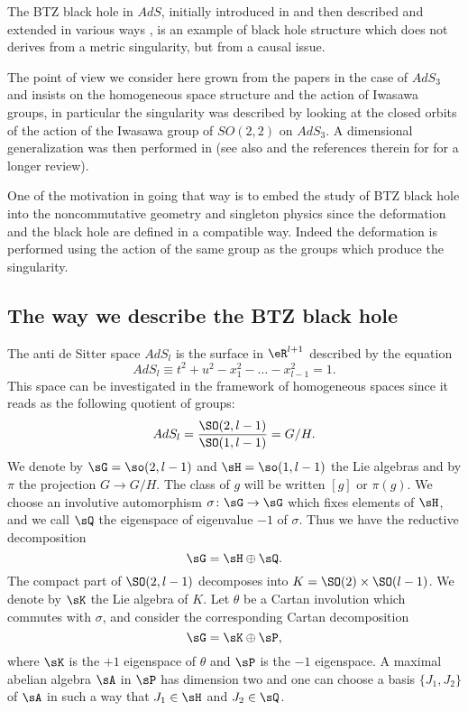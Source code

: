 The BTZ black hole in $AdS$, initially introduced in \cite{BTZ_un,BTZ_deux} and then described and extended in various ways \cite{HolstPeldan,Aminneborg,Madden}, is an example of black hole structure which does not derives from a metric singularity, but from a causal issue.

The point of view we consider here grown from the papers \cite{BTZB_deux,Keio} in the case of $AdS_3$ and insists on the homogeneous space structure and the action of Iwasawa groups, in particular the singularity was described by looking at the closed orbits of the action of the Iwasawa group of $SO(2,2)$ on $AdS_3$. A dimensional generalization was then performed in \cite{lcTNAdS} (see also \cite{These} and the references therein for for a longer review).

One of the motivation in going that way is to embed the study of BTZ black hole into the noncommutative geometry and singleton physics \cite{BTZ_WZW,articleBVCS} since the deformation and the black hole are defined in a compatible way. Indeed the deformation is performed using the action of the same group as the groups which produce the singularity.

%
\subsection{The way we describe the BTZ black hole}
%

The anti de Sitter space $AdS_l$ is the surface in $\eR^{l+1}$ described by the equation
\begin{equation}
	AdS_l\equiv t^2+u^2-x_1^2-\ldots-x_{l-1}^2=1.
\end{equation}
This space can be investigated in the framework of homogeneous spaces since it reads as the following quotient of groups:
\begin{equation}
	AdS_l=\frac{ \SO(2,l-1) }{ \SO(1,l-1) }=G/H.
\end{equation}
We denote by $\sG=\so(2,l-1)$ and $\sH=\so(1,l-1)$ the Lie algebras and by $\pi$ the projection $G\to G/H$. The class of $g$ will be written $[g]$ or $\pi(g)$. We choose an involutive automorphism $\sigma\colon \sG\to \sG$ which fixes elements of $\sH$, and we call $\sQ$ the eigenspace of eigenvalue $-1$ of $\sigma$. Thus we have the reductive decomposition
\begin{equation}		\label{LONGEqIntroRedDecompHQLieAlg}
	\sG=\sH\oplus\sQ.
\end{equation}
The compact part of $\SO(2,l-1)$ decomposes into $K=\SO(2)\times\SO(l-1)$. We denote by $\sK$ the Lie algebra of $K$. Let $\theta$ be a Cartan involution which commutes with $\sigma$, and consider the corresponding Cartan decomposition
\begin{equation}        \label{LONGEqIntroRedDecompKPLieAlg}
	\sG=\sK\oplus\sP,
\end{equation}
where $\sK$ is the $+1$ eigenspace of $\theta$ and $\sP$ is the $-1$ eigenspace. A maximal abelian algebra $\sA$ in $\sP$ has dimension two and one can choose a basis $\{ J_1,J_2 \}$ of $\sA$ in such a way that $J_1\in\sH$ and $J_2\in\sQ$.

